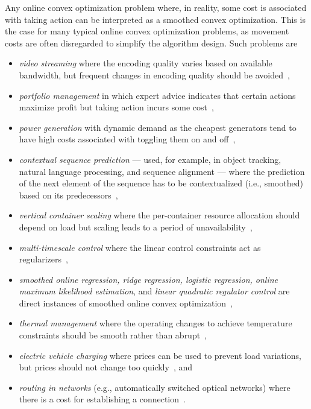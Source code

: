 Any online convex optimization problem where, in reality, some cost is associated with taking action can be interpreted as a smoothed convex optimization. This is the case for many typical online convex optimization problems, as movement costs are often disregarded to simplify the algorithm design. Such problems are

\begin{itemize}
    \item \emph{video streaming} where the encoding quality varies based on available bandwidth, but frequent changes in encoding quality should be avoided~\cite{Lin2012},
    \item \emph{portfolio management} in which expert advice indicates that certain actions maximize profit but taking action incurs some cost~\cite{Calafiore2008, Das2014, Ballu2019},
    \item \emph{power generation} with dynamic demand as the cheapest generators tend to have high costs associated with toggling them on and off~\cite{Lin2012, Badiei2015},
    \item \emph{contextual sequence prediction} --- used, for example, in object tracking, natural language processing, and sequence alignment --- where the prediction of the next element of the sequence has to be contextualized (i.e., smoothed) based on its predecessors~\cite{Kim2015},
    \item \emph{vertical container scaling} where the per-container resource allocation should depend on load but scaling leads to a period of unavailability~\cite{Rossi2019},
    \item \emph{multi-timescale control} where the linear control constraints act as regularizers~\cite{Goel2017},
    \item \emph{smoothed online regression, ridge regression, logistic regression, online maximum likelihood estimation}, and \emph{linear quadratic regulator control} are direct instances of smoothed online convex optimization~\cite{Goel2018, Goel2019_2, Shi2020},
    \item \emph{thermal management} where the operating changes to achieve temperature constraints should be smooth rather than abrupt~\cite{Zanini2009},
    \item \emph{electric vehicle charging} where prices can be used to prevent load variations, but prices should not change too quickly~\cite{Kim2014}, and
    \item \emph{routing in networks} (e.g., automatically switched optical networks) where there is a cost for establishing a connection~\cite{Lin2012}.
\end{itemize}
